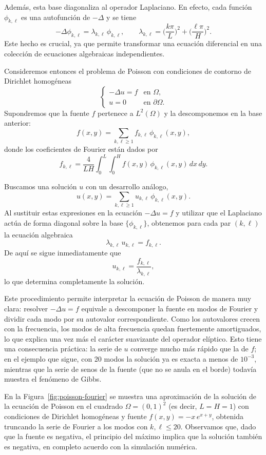 \documentclass[12pt, a4paper]{amsbook}
\theoremstyle{remark}
\theoremstyle{definition}
\numberwithin{section}{chapter}
\numberwithin{subsection}{section}
\numberwithin{equation}{section}
\numberwithin{figure}{chapter}
\begin{document}
Además, esta base diagonaliza al operador Laplaciano. En efecto, cada función $\phi_{k,\ell}$ es una autofunción de $-\Delta$ y se tiene
\[
-\Delta \phi_{k,\ell}
=
\lambda_{k,\ell}\,\phi_{k,\ell},
\qquad
\lambda_{k,\ell}
=
\Big(\frac{k\pi}{L}\Big)^2
+
\Big(\frac{\ell\pi}{H}\Big)^2.
\]
Este hecho es crucial, ya que permite transformar una ecuación diferencial en una colección de ecuaciones algebraicas independientes.

\medskip

Consideremos entonces el problema de Poisson con condiciones de contorno de Dirichlet homogéneas
\[
\begin{cases}
-\Delta u = f & \text{en } \Omega,\\
u = 0 & \text{en } \partial \Omega.
\end{cases}
\]
Supondremos que la fuente $f$ pertenece a $L^2(\Omega)$ y la descomponemos en la base anterior:
\[
f(x,y)
=
\sum_{k,\ell\ge 1}
f_{k,\ell}\,\phi_{k,\ell}(x,y),
\]
donde los coeficientes de Fourier están dados por
\[
f_{k,\ell}
=
\frac{4}{LH}
\int_0^L\int_0^H
f(x,y)\,
\phi_{k,\ell}(x,y)\,dx\,dy.
\]

Buscamos una solución $u$ con un desarrollo análogo,
\[
u(x,y)
=
\sum_{k,\ell\ge 1}
u_{k,\ell}\,\phi_{k,\ell}(x,y).
\]
Al sustituir estas expresiones en la ecuación $-\Delta u = f$ y utilizar que el Laplaciano actúa de forma diagonal sobre la base $\{\phi_{k,\ell}\}$, obtenemos para cada par $(k,\ell)$ la ecuación algebraica
\[
\lambda_{k,\ell}\,u_{k,\ell} = f_{k,\ell}.
\]
De aquí se sigue inmediatamente que
\[
u_{k,\ell} = \frac{f_{k,\ell}}{\lambda_{k,\ell}},
\]
lo que determina completamente la solución.

\medskip

Este procedimiento permite interpretar la ecuación de Poisson de manera muy clara: resolver $-\Delta u = f$ equivale a descomponer la fuente en modos de Fourier y dividir cada modo por su autovalor correspondiente. Como los autovalores crecen con la frecuencia, los modos de alta frecuencia quedan fuertemente amortiguados, lo que explica una vez más el carácter suavizante del operador elíptico. Esto tiene una consecuencia práctica: la serie de $u$ converge mucho más rápido que la de $f$; en el ejemplo que sigue, con 20 modos la solución ya es exacta a menos de $10^{-3}$, mientras que la serie de senos de la fuente (que no se anula en el borde) todavía muestra el fenómeno de Gibbs.

En la Figura~\ref{fig:poisson-fourier} se muestra una aproximación de la solución de la ecuación de Poisson en el cuadrado $\Omega=(0,1)^2$ (es decir, $L=H=1$) con condiciones de Dirichlet homogéneas y fuente $f(x,y)=-x\,e^{x+y}$, obtenida truncando la serie de Fourier a los modos con $k,\ell\le 20$. Observamos que, dado que la fuente es negativa, el principio del máximo implica que la solución también es negativa, en completo acuerdo con la simulación numérica.
\end{document}
